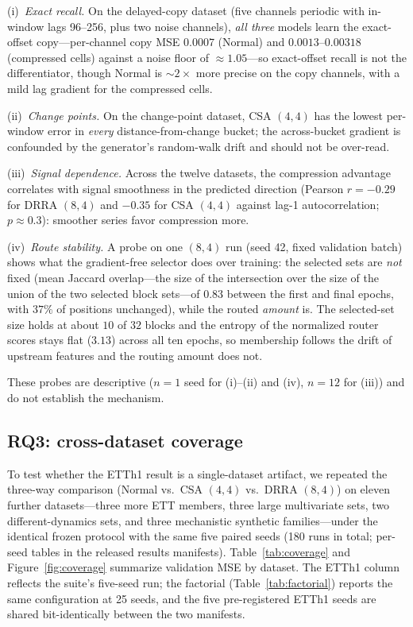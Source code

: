(i)~\emph{Exact recall.} On the delayed-copy dataset (five channels periodic
with in-window lags 96--256, plus two noise channels), \emph{all three} models
learn the exact-offset copy---per-channel copy MSE $0.0007$ (Normal) and
$0.0013$--$0.00318$ (compressed cells) against a noise floor of
${\approx}1.05$---so exact-offset recall is not the differentiator, though
Normal is ${\sim}2\times$ more precise on the copy channels, with a mild lag
gradient for the compressed cells.

(ii)~\emph{Change points.} On the change-point dataset, CSA $(4,4)$ has the
lowest per-window error in \emph{every} distance-from-change bucket; the
across-bucket gradient is confounded by the generator's random-walk drift and
should not be over-read.

(iii)~\emph{Signal dependence.} Across the twelve datasets, the compression
advantage correlates with signal smoothness in the predicted direction (Pearson
$r = -0.29$ for DRRA $(8,4)$ and $-0.35$ for CSA $(4,4)$ against lag-1
autocorrelation; $p \approx 0.3$): smoother series favor compression more.

(iv)~\emph{Route stability.} A probe on one $(8,4)$ run (seed 42, fixed
validation batch) shows what the gradient-free selector does over training: the
selected sets are \emph{not} fixed (mean Jaccard overlap---the size of the
intersection over the size of the union of the two selected block sets---of
$0.83$ between the first and
final epochs, with $37\%$ of positions unchanged), while the routed
\emph{amount} is. The selected-set size holds at about $10$ of $32$ blocks and
the entropy of the normalized router scores stays flat ($3.13$) across all
ten epochs, so
membership follows the drift of upstream features and the routing amount does
not.

These probes are descriptive ($n{=}1$ seed for (i)--(ii) and (iv), $n{=}12$ for
(iii)) and do not establish the mechanism.

\subsection{RQ3: cross-dataset coverage}
\label{sec:rq3}
To test whether the ETTh1 result is a single-dataset artifact, we repeated
the three-way comparison (Normal vs.\ CSA $(4,4)$ vs.\ DRRA $(8,4)$) on eleven
further datasets---three more ETT members, three large multivariate sets,
two different-dynamics sets, and three mechanistic synthetic families---under
the identical frozen protocol with the same five paired seeds (180 runs in
total; per-seed tables in the released results manifests). Table~\ref{tab:coverage} and
Figure~\ref{fig:coverage} summarize validation MSE by dataset. The ETTh1
column reflects the suite's five-seed run; the factorial
(Table~\ref{tab:factorial}) reports the same configuration at 25 seeds, and
the five pre-registered ETTh1 seeds are shared bit-identically between the
two manifests.

